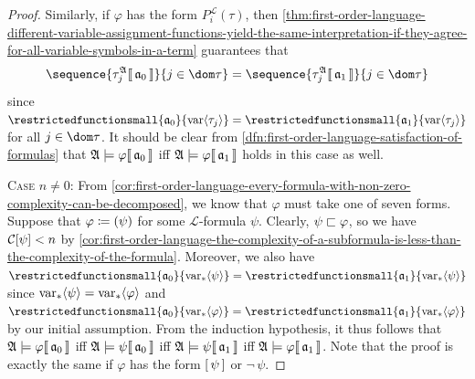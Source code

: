 \begin{proof}
    \vspace{0.3cm}
    \noindent
    Similarly, if \( \varphi \) has the form \( P^{\mathcal{L}}_{i}(\tau) \),
    then \cref{thm:first-order-language-different-variable-assignment-functions-yield-the-same-interpretation-if-they-agree-for-all-variable-symbols-in-a-term}
    guarantees that
    \begin{equation*}
        \sequence{ \folterminterpretation{\tau_{j}}{\mathfrak{A}}{\mathfrak{a}_{0}} }{j \in \dom \tau}
        =
        \sequence{ \folterminterpretation{\tau_{j}}{\mathfrak{A}}{\mathfrak{a}_{1}} }{j \in \dom \tau}
    \end{equation*}
    since \( \restrictedfunctionsmall{\mathfrak{a}_{0}}{ \folvars{\tau_{j}} } = \restrictedfunctionsmall{\mathfrak{a}_{1}}{ \folvars{\tau_{j}} } \) for all
    \( j \in \dom \tau \). It should be clear from \cref{dfn:first-order-language-satisfaction-of-formulas} that
    \(  \mathfrak{A} \models \varphi\llbracket\, \mathfrak{a}_{0} \,\rrbracket \) iff \(  \mathfrak{A} \models \varphi\llbracket\, \mathfrak{a}_{1} \,\rrbracket \) holds in this case as well.

    \vspace{0.3cm}
    \noindent
    {\scshape Case} \( n \neq 0 \): From \cref{cor:first-order-language-every-formula-with-non-zero-complexity-can-be-decomposed}, we know that
    \( \varphi \) must take one of seven forms.
    Suppose that \( \varphi \coloneq \mleft( \psi \mright) \) for some \( \mathcal{L} \)-formula \( \psi \).
    Clearly, \( \psi  \sqsubset  \varphi \),
    so we have \( \folcomplexityofformula{\psi} < n \) by \cref{cor:first-order-language-the-complexity-of-a-subformula-is-less-than-the-complexity-of-the-formula}.
    Moreover, we also have \( \restrictedfunctionsmall{\mathfrak{a}_{0}}{ \folfreevars{\psi} } = \restrictedfunctionsmall{\mathfrak{a}_{1}}{ \folfreevars{\psi} } \)
    since \( \operatorname{var}_{\ast} \langle\psi\rangle = \operatorname{var}_{\ast} \langle\varphi\rangle \) and
    \( \restrictedfunctionsmall{\mathfrak{a}_{0}}{\folfreevars{\varphi}} = \restrictedfunctionsmall{\mathfrak{a}_{1}}{\folfreevars{\varphi}} \) by our initial assumption.
    From the induction hypothesis, it thus follows that \(  \mathfrak{A} \models \varphi\llbracket\, \mathfrak{a}_{0} \,\rrbracket \) iff \(  \mathfrak{A} \models \psi\llbracket\, \mathfrak{a}_{0} \,\rrbracket \)
    iff \(  \mathfrak{A} \models \psi\llbracket\, \mathfrak{a}_{1} \,\rrbracket \) iff \(  \mathfrak{A} \models \varphi\llbracket\, \mathfrak{a}_{1} \,\rrbracket \).
    Note that the proof is exactly the same if \( \varphi \) has the form \( \mleft[ \, \psi \, \mright] \) or \( \lnot \, \psi \).


\end{proof}
